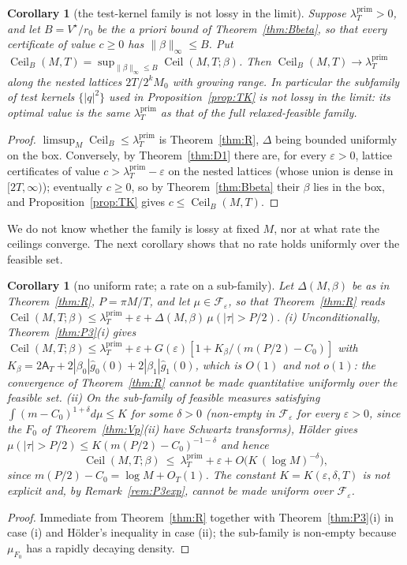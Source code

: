 \documentclass[11pt]{amsart}
\newtheorem{corollary}[theorem]{Corollary}
\theoremstyle{definition}
\theoremstyle{remark}
\newcommand{\lamP}{\lambda^{\mathrm{prim}}_T}
\newcommand{\gh}[1]{\widehat g_{#1}}
\newcommand{\Aconst}{\mathsf A_T}
\begin{document}
\begin{corollary}[the test-kernel family is not lossy in the limit]\label{cor:R3}
Suppose $\lamP>0$, and let $B=V^\star/r_0$ be the a priori bound of Theorem~\ref{thm:Bbeta}, so that
every certificate of value $c\ge0$ has $\|\beta\|_\infty\le B$. Put
$\operatorname{Ceil}_B(M,T)=\sup_{\|\beta\|_\infty\le B}\operatorname{Ceil}(M,T;\beta)$. Then
$\operatorname{Ceil}_B(M,T)\to\lamP$ along the nested lattices $2T/2^kM_0$ with growing range. In
particular the subfamily of test kernels $\{|q|^2\}$ used in Proposition~\ref{prop:TK} is not lossy in
the limit: its optimal value is the same $\lamP$ as that of the full relaxed-feasible family.
\end{corollary}
\begin{proof}
$\limsup_M\operatorname{Ceil}_B\le\lamP$ is Theorem~\ref{thm:R}, $\Delta$ being bounded uniformly on
the box. Conversely, by Theorem~\ref{thm:D1} there are, for every $\varepsilon>0$, lattice
certificates of value $c>\lamP-\varepsilon$ on the nested lattices (whose union is dense in
$[2T,\infty)$); eventually $c\ge0$, so by Theorem~\ref{thm:Bbeta} their $\beta$ lies in the box, and
Proposition~\ref{prop:TK} gives $c\le\operatorname{Ceil}_B(M,T)$.
\end{proof}
We do not know whether the family is lossy at fixed $M$, nor at what rate the ceilings converge. The
next corollary shows that no rate holds uniformly over the feasible set.

\begin{corollary}[no uniform rate; a rate on a sub-family]\label{cor:CP}
Let $\Delta(M,\beta)$ be as in Theorem~\ref{thm:R}, $P=\pi M/T$, and let
$\mu\in\mathcal F_\varepsilon$, so that Theorem~\ref{thm:R} reads
$\operatorname{Ceil}(M,T;\beta)\le\lamP+\varepsilon+\Delta(M,\beta)\,\mu(|\tau|>P/2)$.
\emph{(i)} Unconditionally, Theorem~\ref{thm:P3}(i) gives
$\operatorname{Ceil}(M,T;\beta)\le\lamP+\varepsilon+G(\varepsilon)[1+K_\beta/(m(P/2)-C_0)]$ with
$K_\beta=2\Aconst+2|\beta_0|\gh0(0)+2|\beta_1|\gh1(0)$, which is $O(1)$ and not $o(1)$: the
convergence of Theorem~\ref{thm:R} cannot be made quantitative uniformly over the feasible set.
\emph{(ii)} On the sub-family of feasible measures satisfying $\int(m-C_0)^{1+\delta}d\mu\le K$ for
some $\delta>0$ (non-empty in $\mathcal F_\varepsilon$ for every $\varepsilon>0$, since the $F_0$
of Theorem~\ref{thm:Vp}(ii) have Schwartz transforms), H\"older gives
$\mu(|\tau|>P/2)\le K(m(P/2)-C_0)^{-1-\delta}$ and hence
\[
\operatorname{Ceil}(M,T;\beta)\ \le\ \lamP+\varepsilon+O\big(K\,(\log M)^{-\delta}\big),
\]
since $m(P/2)-C_0=\log M+O_T(1)$. The constant $K=K(\varepsilon,\delta,T)$ is not explicit and, by
Remark~\ref{rem:P3exp}, cannot be made uniform over $\mathcal F_\varepsilon$.
\end{corollary}
\begin{proof}
Immediate from Theorem~\ref{thm:R} together with Theorem~\ref{thm:P3}(i) in case (i) and
H\"older's inequality in case (ii); the sub-family is non-empty because $\mu_{F_0}$ has a rapidly
decaying density.
\end{proof}
\end{document}
